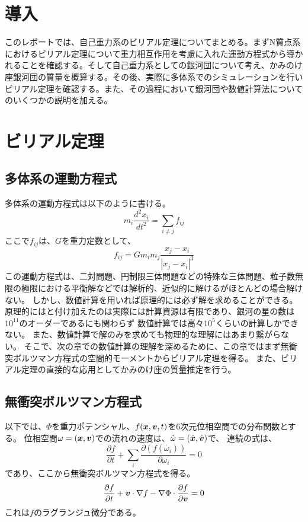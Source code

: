 \documentclass{jsarticle}
\begin{document}
\fi
\section  {導入}
このレポートでは、自己重力系のビリアル定理についてまとめる。まずN質点系におけるビリアル定理について重力相互作用を考慮に入れた運動方程式から導かれることを確認する。そして自己重力系としての銀河団について考え、かみのけ座銀河団の質量を概算する。その後、実際に多体系でのシミュレーションを行いビリアル定理を確認する。また、その過程において銀河団や数値計算法についてのいくつかの説明を加える。
\section  {ビリアル定理}
\subsection{多体系の運動方程式}
多体系の運動方程式は以下のように書ける。
\begin{equation}
	m_i \frac{d^2x_i}{dt^2} = \sum_{i \neq j} f_{ij}
\end{equation}	
ここで$f_{ij}$は、$G$を重力定数として、
\begin{equation}
	f_{ij} = G m_i m_j \frac{x_j - x_i}{|x_j - x_i|^3}
\end{equation}	
この運動方程式は、二対問題、円制限三体問題などの特殊な三体問題、粒子数無限の極限における平衡解などでは解析的、近似的に解けるがほとんどの場合解けない。
しかし、数値計算を用いれば原理的には必ず解を求めることができる。原理的にはと付け加えたのは実際には計算資源は有限であり、銀河の星の数は$10^{11}$のオーダーであるにも関わらず
数値計算では高々$10^5$くらいの計算しかできない。
また、数値計算で解のみを求めても物理的な理解にはあまり繋がらない。
そこで、次の章での数値計算の理解を深めるために、この章ではまず無衝突ボルツマン方程式の空間的モーメントからビリアル定理を得る。
また、ビリアル定理の直接的な応用としてかみのけ座の質量推定を行う。

\subsection{無衝突ボルツマン方程式}
以下では、$\Phi$を重力ポテンシャル、$f(\bm{x}, \bm{v}, t)$を6次元位相空間での分布関数とする。
位相空間$\omega = (\bm{x}, \bm{v})$での流れの速度は、$\dot{\omega} = (\dot{\bm{x}}, \dot{\bm{v}})$で、
連続の式は、
\begin{equation}	
	\frac{\partial f}{\partial t} + \sum_i \frac{\partial (f(\dot{\omega_i}))}{\partial \omega_i} = 0
\end{equation}	
であり、ここから無衝突ボルツマン方程式を得る。
\begin{equation}	
	\label{bolzman}
	\frac{\partial f}{\partial t} + \bm{v}\cdot\nabla f - \nabla\Phi\cdot\frac{\partial f}{\partial \bm{v}}= 0
\end{equation}	
これは$f$のラグランジュ微分である。
\end{document}
